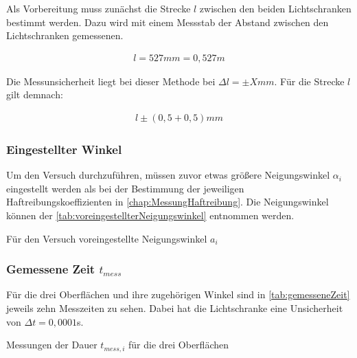 Als Vorbereitung muss zunächst die Strecke $l$ zwischen den beiden Lichtschranken bestimmt werden.
Dazu wird mit einem Messstab der Abstand zwischen den Lichtschranken gemessenen.

\begin{align*}
    l = 527 mm = 0,527 m
\end{align*}

Die Messunsicherheit liegt bei dieser Methode bei $\Delta l = \pm X mm$. Für die Strecke $l$ gilt demnach:

\begin{align*}
    l \pm (0,5 + 0,5)mm
\end{align*}

\subsubsection{Eingestellter Winkel}

Um den Versuch durchzuführen, müssen zuvor etwas größere Neigungswinkel $\alpha_i$ eingestellt werden als bei der Bestimmung der jeweiligen Haftreibungskoeffizienten in \autoref{chap:MessungHaftreibung}. Die Neigungswinkel können der \autoref{tab:voreingestellterNeigungswinkel} entnommen werden.

\begin{table}[h]
    \center
    \caption[]{Für den Versuch voreingestellte Neigungswinkel $a_i$}
    
    \label{tab:voreingestellterNeigungswinkel}
\end{table}

\subsubsection{Gemessene Zeit $t_{mess}$}

Für die drei Oberflächen und ihre zugehörigen Winkel sind in \autoref{tab:gemesseneZeit} jeweils zehn Messzeiten zu sehen. Dabei hat die Lichtschranke eine Unsicherheit von $\Delta t = 0,0001$s.

\begin{table}[h]
    \center 
    \caption[short]{Messungen der Dauer $t_{mess, i}$ für die drei Oberflächen}
    
    \label{tab:gemesseneZeit} 
\end{table}